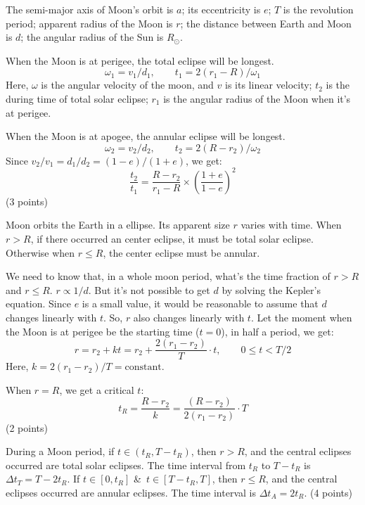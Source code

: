 The semi-major axis of Moon's orbit is $a$; its eccentricity is $e$; $T$ is
the revolution period; apparent radius of the Moon is $r$; the distance
between Earth and Moon is $d$; the angular radius of the Sun is $R_\odot$.

When the Moon is at perigee, the total eclipse will be longest.
\[
\omega_1 = v_1/d_1, \qquad t_1 = 2(r_1 - R)/\omega_1
\]
Here, $\omega$ is the angular velocity of the moon, and $v$ is its linear
velocity; $t_2$ is the during time of total solar eclipse; $r_1$ is the
angular radius of the Moon when it's at perigee.

When the Moon is at apogee, the annular eclipse will be longest.
\[
\omega_2 = v_2/d_2, \qquad t_2 = 2(R - r_2)/\omega_2
\]
Since $v_2/v_1 = d_1/d_2 = (1-e)/(1+e)$, we get:
\begin{equation}
\frac{t_2}{t_1} = \frac{R-r_2}{r_1-R}\times\left(\frac{1+e}{1-e}\right)^2
\tag{1}
\end{equation}
\hfill(3 points)

Moon orbits the Earth in a ellipse. Its apparent size $r$ varies with time.
When $r > R$, if there occurred an center eclipse, it must be total solar
eclipse. Otherwise when $r \le R$, the center eclipse must be annular.

We need to know that, in a whole moon period, what's the time fraction of
$r > R$ and $r \le R$. $r \propto 1/d$. But it's not possible to get $d$ by
solving the Kepler's equation. Since $e$ is a small value, it would be
reasonable to assume that $d$ changes linearly with $t$. So, $r$ also changes
linearly with $t$. Let the moment when the Moon is at perigee be the starting
time ($t=0$), in half a period, we get:
\[
r = r_2 + kt = r_2 + \frac{2(r_1-r_2)}{T}\cdot t, \qquad 0 \le t < T/2
\]
Here, $k = 2(r_1-r_2)/T = \mathrm{constant}$.

When $r = R$, we get a critical $t$:
\begin{equation}
t_R = \frac{R-r_2}{k} = \frac{(R-r_2)}{2(r_1-r_2)}\cdot T
\tag{2}
\end{equation}
\hfill(2 points)

During a Moon period, if $t \in (t_R, T-t_R)$, then $r > R$, and the central
eclipses occurred are total solar eclipses. The time interval from $t_R$ to
$T-t_R$ is $\Delta t_T = T - 2t_R$. If $t \in [0, t_R]$ \&\ $t \in [T-t_R, T]$,
then $r \le R$, and the central eclipses occurred are annular eclipses. The
time interval is $\Delta t_A = 2t_R$.
\hfill(4 points)

